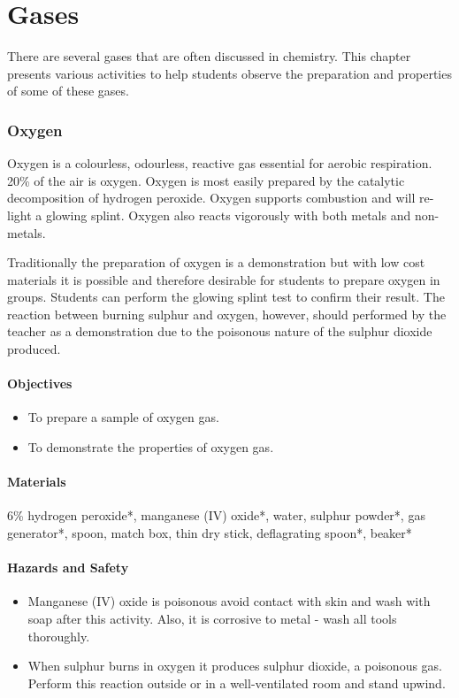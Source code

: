 \chapter{Gases}

There are several gases that are often discussed in chemistry. This chapter presents various activities to help students observe the preparation and properties of some of these gases.

\subsection{Oxygen}

Oxygen is a colourless, odourless, reactive gas essential for aerobic respiration. 20\% of the air is oxygen. Oxygen is most easily prepared by the catalytic decomposition of hydrogen peroxide. Oxygen supports combustion and will re-light a glowing splint. Oxygen also reacts vigorously with both metals and non-metals.

Traditionally the preparation of oxygen is a demonstration but with low cost materials it is possible and therefore desirable for students to prepare oxygen in groups. Students can perform the glowing splint test to confirm their result. The reaction between burning sulphur and oxygen, however, should performed by the teacher as a demonstration due to the poisonous nature of the sulphur dioxide produced.

\subsubsection*{Objectives}
\begin{itemize}
\item{To prepare a sample of oxygen gas.}
\item{To demonstrate the properties of oxygen gas.}
\end{itemize}

\subsubsection*{Materials}
6\% hydrogen peroxide*, manganese (IV) oxide*, water, sulphur powder*, gas generator*, spoon, match box, thin dry stick, deflagrating spoon*, beaker*

\subsubsection*{Hazards and Safety}
\begin{itemize}
\item{Manganese (IV) oxide is poisonous avoid contact with skin and wash with soap after this activity. Also, it is corrosive to metal - wash all tools thoroughly.}
\item{When sulphur burns in oxygen it produces sulphur dioxide, a poisonous gas. Perform this reaction outside or in a well-ventilated room and stand upwind.}
\end{itemize}

